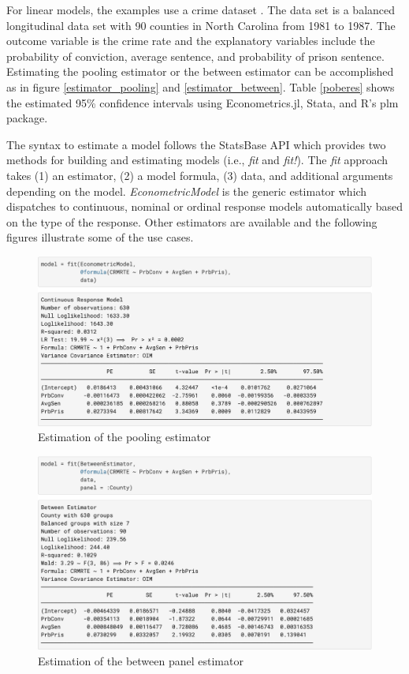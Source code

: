 \documentclass{juliacon}
\begin{document}
For linear models, the examples use a crime dataset \cite{Crime}. The data set is a balanced longitudinal data set with 90 counties in North Carolina from 1981 to 1987. The outcome variable is the crime rate and the explanatory variables include the probability of conviction, average sentence, and probability of prison sentence. Estimating the pooling estimator or the between estimator can be accomplished as in figure \vref{estimator_pooling} and \vref{estimator_between}. Table \vref{poberes} shows the estimated 95\% confidence intervals using Econometrics.jl, Stata, and R's plm package.

The syntax to estimate a model follows the StatsBase API which provides two methods for building and estimating models (i.e., \textit{fit} and \textit{fit!}). The \textit{fit} approach takes (1) an estimator, (2) a model formula, (3) data, and additional arguments depending on the model. \textit{EconometricModel} is the generic estimator which dispatches to continuous, nominal or ordinal response models automatically based on the type of the response. Other estimators are available and the following figures illustrate some of the use cases.

\begin{figure}[hbpt]
    \includegraphics[max width=\linewidth,center]{estimator_pooling}
	\caption{Estimation of the pooling estimator}
	\label{estimator_pooling}
\end{figure}

\begin{figure}[hbpt]
    \includegraphics[max width=\linewidth,center]{estimator_between}
	\caption{Estimation of the between panel estimator}
	\label{estimator_between}
\end{figure}
\end{document}
